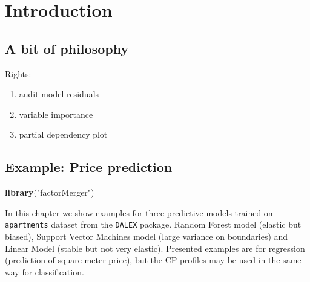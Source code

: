 \documentclass[]{krantz}
\newenvironment{Shaded}{\begin{snugshade}}{\end{snugshade}}
\newcommand{\KeywordTok}[1]{\textcolor[rgb]{0.13,0.29,0.53}{\textbf{#1}}}
\newcommand{\NormalTok}[1]{#1}
\newcommand{\StringTok}[1]{\textcolor[rgb]{0.31,0.60,0.02}{#1}}
\providecommand{\tightlist}{%
  \setlength{\itemsep}{0pt}\setlength{\parskip}{0pt}}
\theoremstyle{definition}
\theoremstyle{definition}
\theoremstyle{definition}
\theoremstyle{remark}
\begin{document}
\hypertarget{introduction-2}{%
\section{Introduction}\label{introduction-2}}

\hypertarget{a-bit-of-philosophy}{%
\subsection{A bit of philosophy}\label{a-bit-of-philosophy}}

Rights:

\begin{enumerate}
\def\labelenumi{\arabic{enumi}.}
\tightlist
\item
  audit model residuals
\item
  variable importance
\item
  partial dependency plot
\end{enumerate}

\hypertarget{example-price-prediction}{%
\subsection{Example: Price prediction}\label{example-price-prediction}}

\citep{R-DALEX}

\citep{R-e1071}

\citep{R-factorMerger}

\begin{Shaded}
\begin{Highlighting}[]
\KeywordTok{library}\NormalTok{(}\StringTok{"factorMerger"}\NormalTok{)}
\end{Highlighting}
\end{Shaded}

In this chapter we show examples for three predictive models trained on
\texttt{apartments} dataset from the \texttt{DALEX} package. Random
Forest model (elastic but biased), Support Vector Machines model (large
variance on boundaries) and Linear Model (stable but not very elastic).
Presented examples are for regression (prediction of square meter
price), but the CP profiles may be used in the same way for
classification.
\end{document}
